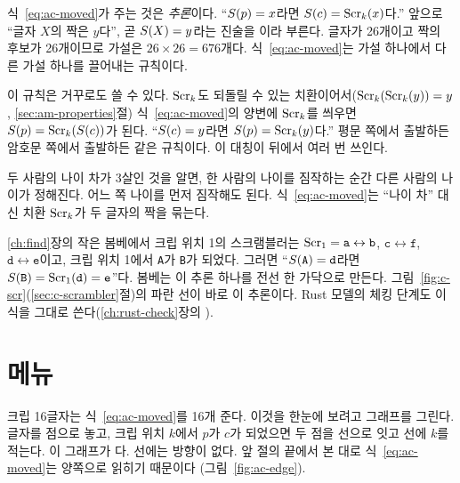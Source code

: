 식~\eqref{eq:ac-moved}가 주는 것은 \emph{추론}이다. ``$S(p) = x$라면 $S(c) = \mathrm{Scr}_k(x)$다.'' 앞으로
``글자 $X$의 짝은 $y$다'', 곧 $S(X) = y$라는 진술을 이라 부른다. 글자가 26개이고 짝의
후보가 26개이므로 가설은 $26 \times 26 = 676$개다. 식~\eqref{eq:ac-moved}는 가설 하나에서 다른 가설 하나를 끌어내는
규칙이다.

이 규칙은 거꾸로도 쓸 수 있다. $\mathrm{Scr}_k$도 되돌릴 수 있는 치환이어서($\mathrm{Scr}_k(\mathrm{Scr}_k(y)) = y$,
\ref{sec:am-properties}절) 식~\eqref{eq:ac-moved}의 양변에 $\mathrm{Scr}_k$를 씌우면 $S(p) = \mathrm{Scr}_k(S(c))$가 된다.
``$S(c) = y$라면 $S(p) = \mathrm{Scr}_k(y)$다.'' 평문 쪽에서 출발하든 암호문 쪽에서 출발하든 같은 규칙이다. 이 대칭이
뒤에서 여러 번 쓰인다.

\General 두 사람의 나이 차가 3살인 것을 알면, 한 사람의 나이를 짐작하는 순간 다른 사람의 나이가 정해진다. 어느
쪽 나이를 먼저 짐작해도 된다. 식~\eqref{eq:ac-moved}는 ``나이 차'' 대신 치환 $\mathrm{Scr}_k$가 두 글자의 짝을 묶는다.

\Ours \ref{ch:find}장의 작은 봄베에서 크립 위치 1의 스크램블러는 $\mathrm{Scr}_1 = \mathtt{a}\leftrightarrow\mathtt{b}$,
$\mathtt{c}\leftrightarrow\mathtt{f}$, $\mathtt{d}\leftrightarrow\mathtt{e}$이고, 크립 위치 1에서 \texttt{A}가 \texttt{B}가
되었다. 그러면 ``$S(\mathtt{A}) = \mathtt{d}$라면 $S(\mathtt{B}) = \mathrm{Scr}_1(\mathtt{d}) = \mathtt{e}$''다. 봄베는 이
추론 하나를 전선 한 가닥으로 만든다. 그림~\ref{fig:c-scr}(\ref{sec:c-scrambler}절)의 파란 선이 바로 이 추론이다.
Rust 모델의 체킹 단계도 이 식을 그대로 쓴다(\ref{ch:rust-check}장의 ).

\section{메뉴}\label{sec:ac-menu}

크립 16글자는 식~\eqref{eq:ac-moved}를 16개 준다. 이것을 한눈에 보려고 그래프를 그린다. 글자를 점으로 놓고, 크립
위치 $k$에서 $p$가 $c$가 되었으면 두 점을 선으로 잇고 선에 $k$를 적는다. 이 그래프가 다.
선에는 방향이 없다. 앞 절의 끝에서 본 대로 식~\eqref{eq:ac-moved}는 양쪽으로 읽히기 때문이다
(그림~\ref{fig:ac-edge}).

